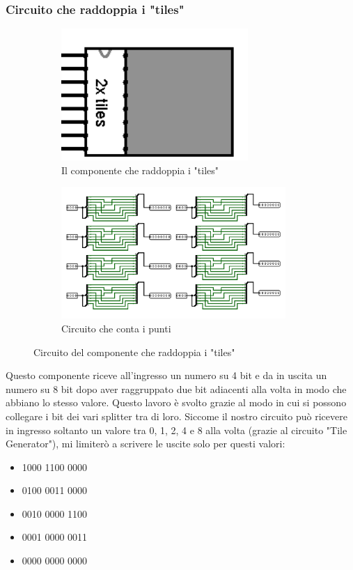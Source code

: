 \documentclass[11pt]{article}
\begin{document}
\pagebreak
\subsubsection{Circuito che raddoppia i "tiles"}

\begin{figure}[h]
\begin{subfigure}{0.3\textwidth}
\includegraphics[width=0.95\linewidth, height=5cm]{immagini/componente_tile_doubler} 
\caption{Il componente che raddoppia i "tiles"}
\label{fig:subfig8}
\end{subfigure}
\begin{subfigure}{0.7\textwidth}
\includegraphics[width=1.1\linewidth, height=5cm]{immagini/circuito_tile_doubler}
\caption{Circuito che conta i punti}
\label{fig:subfig10}
\end{subfigure}
\caption{Circuito del componente che raddoppia i "tiles"}
\label{fig:fig15}
\end{figure}

Questo componente riceve all'ingresso un numero su 4 bit e da in uscita un numero su 8 bit
dopo aver raggruppato due bit adiacenti alla volta in modo che abbiano lo stesso valore. Questo lavoro
è svolto grazie al modo in cui si possono collegare i bit dei vari splitter tra di loro.
Siccome il nostro circuito può ricevere in ingresso soltanto un valore tra 0, 1, 2, 4 e 8 alla volta (grazie al circuito "Tile Generator"),
mi limiterò a scrivere le uscite solo per questi valori:

\begin{itemize}
\item 1000  1100 0000
\item 0100  0011 0000
\item 0010  0000 1100
\item 0001  0000 0011
\item 0000  0000 0000
\end{itemize}
\end{document}
